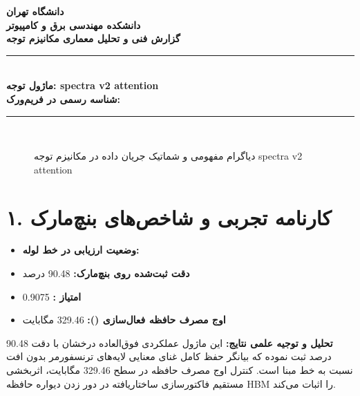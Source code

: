 \documentclass[12pt,a4paper]{article}
\begin{document}
\begin{center}
{\Large\bfseries دانشگاه تهران}\\[0.2cm]
{\large\bfseries دانشکده مهندسی برق و کامپیوتر}\\[0.2cm]
{\large\bfseries گزارش فنی و تحلیل معماری مکانیزم توجه}\\[0.5cm]
\rule{\linewidth}{1pt}\\[0.3cm]
{\LARGE\bfseries ماژول توجه: spectra v2 attention}\\[0.2cm]
{\large \textbf{شناسه رسمی در فریم‌ورک:} }\\[0.2cm]
\rule{\linewidth}{1pt}\\[0.5cm]
\end{center}

\begin{figure}[H]
\centering
{}
\caption{دیاگرام مفهومی و شماتیک جریان داده در مکانیزم توجه spectra v2 attention}
\end{figure}

\section*{۱. کارنامه تجربی و شاخص‌های بنچ‌مارک}
\begin{itemize}
\item \textbf{وضعیت ارزیابی در خط لوله:} 
\item \textbf{دقت ثبت‌شده روی بنچ‌مارک:} 90.48 درصد
\item \textbf{امتیاز :} 0.9075
\item \textbf{اوج مصرف حافظه فعال‌سازی ():} 329.46 مگابایت
\end{itemize}
\textbf{تحلیل و توجیه علمی نتایج:} این ماژول عملکردی فوق‌العاده درخشان با دقت 90.48 درصد ثبت نموده که بیانگر حفظ کامل غنای معنایی لایه‌های ترنسفورمر بدون افت نسبت به خط مبنا است. کنترل اوج مصرف حافظه در سطح 329.46 مگابایت، اثربخشی مستقیم فاکتورسازی ساختاریافته در دور زدن دیواره حافظه HBM را اثبات می‌کند.
\end{document}
